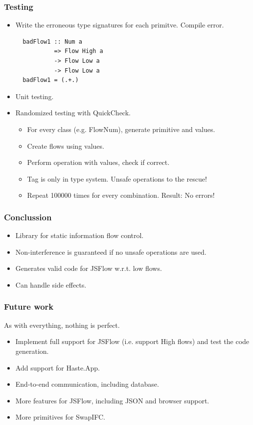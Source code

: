 \documentclass{beamer}
\begin{document}
\begin{frame}[fragile]
  \frametitle{Testing}
  \begin{itemize}
    \item Write the erroneous type signatures for each primitve. Compile error. \pause
\begin{verbatim}
  badFlow1 :: Num a
           => Flow High a
           -> Flow Low a
           -> Flow Low a
  badFlow1 = (.+.)
\end{verbatim}
\pause
    \item Unit testing. \pause
    \item Randomized testing with QuickCheck. \pause
      \begin{itemize}
        \item For every class (e.g. FlowNum), generate primitive and values. \pause
        \item Create flows using values. \pause
        \item Perform operation with values, check if correct. \pause
        \item Tag is only in type system. \pause Unsafe operations to the rescue! \pause
        \item Repeat 100000 times for every combination. \pause Result: No errors!
      \end{itemize}
  \end{itemize}
\end{frame}


\begin{frame}
  \frametitle{Conclussion}
  \begin{itemize}
    \item Library for static information flow control. \pause
    \item Non-interference is guaranteed if no unsafe operations are used. \pause
    \item Generates valid code for JSFlow w.r.t. low flows. \pause
    \item Can handle side effects.
  \end{itemize}
\end{frame}


\begin{frame}
  \frametitle{Future work}
  As with everything, nothing is perfect. \pause
  \begin{itemize}
    \item Implement full support for JSFlow (i.e. support High flows) and test the code generation. \pause
    \item Add support for Haste.App. \pause
    \item End-to-end communication, including database. \pause
    \item More features for JSFlow, including JSON and browser support. \pause
    \item More primitives for SwapIFC.
  \end{itemize}
\end{frame}
\end{document}
